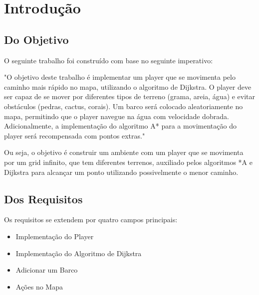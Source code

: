 \documentclass[
	12pt,				%
	oneside,			%
	a4paper,			%
	english,			%
	brazil,				%
	]{abntex2}
\begin{document}
\frenchspacing 

\imprimircapa

{
\ABNTEXchapterfont

\textual

\section{Introdução}

\subsection{Do Objetivo}\label{sub:do_objetivo} %

O seguinte trabalho foi construído com base no seguinte imperativo: 

"O objetivo deste trabalho é implementar um player que se movimenta pelo caminho mais rápido no mapa, utilizando o algoritmo de Dijkstra. O player deve ser capaz de se mover por diferentes tipos de terreno (grama, areia, água) e evitar obstáculos (pedras, cactus, corais). Um barco será colocado aleatoriamente no mapa, permitindo que o player navegue na água com velocidade dobrada. Adicionalmente, a implementação do algoritmo A* para a movimentação do player será recompensada com pontos extras."

Ou seja, o objetivo é construir um ambiente com um player que se movimenta por um grid infinito, que tem diferentes terrenos, auxiliado pelos algoritmos *A e Dijkstra para alcançar um ponto utilizando possivelmente o menor caminho. 


\subsection{Dos Requisitos}\label{sub:dos_requisitos} %

Os requisitos se extendem por quatro campos principais:

\begin{itemize}
    \item Implementação do Player
    \item Implementação do Algoritmo de Dijkstra
    \item Adicionar um Barco
    \item Ações no Mapa
\end{itemize}

}
\end{document}
